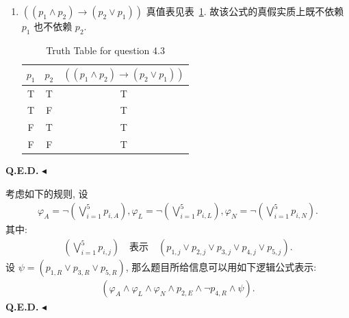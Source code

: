 \documentclass[11pt]{article}
\newenvironment{question}[2][Question]{\begin{trivlist}
    \item[\hskip \labelsep {\bfseries #1}\hskip \labelsep {\bfseries #2.}]\songti}{\hfill$\blacktriangleleft$\end{trivlist}}
\newcommand\1{\mathds{1}}
\newcommand{\ed}{\textbf{Q.E.D.}}
\begin{document}
\begin{question}{4 (15分)}
\begin{enumerate}
        \item $((p_1 \land p_2) \to (p_2 \lor p_1))$ 真值表见表~\ref{tab:4.3}.     
        故该公式的真假实质上既不依赖 $p_1$ 也不依赖 $p_2$.
        \begin{table}[htbp]
            \centering
            \caption{Truth Table for question 4.3}
            \label{tab:4.3}
            \begin{tabular}{ccc}
                \toprule
                $p_1$ & $p_2$ & $((p_1 \land p_2) \to (p_2 \lor p_1))$ \\
                \midrule
                T & T & T \\
                T & F & T \\
                F & T & T \\
                F & F & T \\
                \bottomrule
            \end{tabular}
        \end{table}
    \end{enumerate}
    \ed
\end{question}

\begin{question}{5 (5分)}
    考虑如下的规则, 设
    \begin{align*}
        \varphi_A = \lnot\left(\bigvee_{i=1}^5 p_{i,A}\right), \varphi_L = \lnot\left(\bigvee_{i=1}^5 p_{i,L}\right), \varphi_N = \lnot\left(\bigvee_{i=1}^5 p_{i,N}\right).
    \end{align*}
    其中:
    \begin{align*}
        \left(\bigvee_{i=1}^5 p_{i,j}\right) \quad \text{表示} \quad  (p_{1,j} \lor p_{2,j} \lor p_{3,j} \lor p_{4,j} \lor p_{5,j}).
    \end{align*}
    设 $\psi = (p_{1, R} \lor p_{3,R} \lor p_{5,R})$, 那么题目所给信息可以用如下逻辑公式表示:
    \begin{align*}
        (\varphi_A \land \varphi_L \land \varphi_N \land p_{2,E} \land \lnot p_{4, R} \land \psi).
    \end{align*}
    \ed
\end{question}
\end{document}
